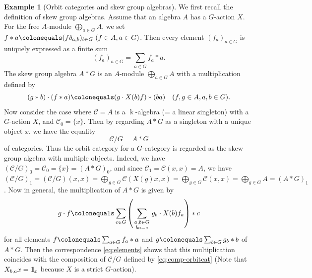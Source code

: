 \documentclass{surv-l}
\numberwithin{equation}{chapter}
\numberwithin{figure}{chapter}
\theoremstyle{plain}
\theoremstyle{definition}
\newtheorem{exm}[thm]{Example}
\theoremstyle{remark}
\newcommand{\id}{1\kern-.25em{\text{{\rm l}}}}
\begin{document}
\begin{exm}[Orbit categories and skew group algebras]\label{exm:skew-gp-alg}
We first recall the definition of skew group algebras.
Assume that an algebra $A$ has a $G$-action $X$.
For the free $A$-module
$\bigoplus_{a\in G}A$, we set $f * a\colonequals  (f \delta_{a,b})_{b \in G}\ (f \in A, a \in G)$.
Then every element $(f_a)_{a \in G}$ is uniquely expressed as a finite sum
\begin{equation}\label{eq:elements}
(f_a)_{a \in G} = \sum_{a \in G}f_a * a.
\end{equation}
The skew group algebra $A * G$ is an $A$-module $\bigoplus_{a\in G}A$
with a multiplication defined by
\[
(g * b) \cdot (f * a) \colonequals  (g \cdot X(b)f)*(ba) \quad (f, g \in A, a, b \in G).
\]
Now consider the case where ${\mathcal{C}} = A$ is a $\Bbbk$-algebra (= a linear singleton) with a $G$-action $X$,
and ${\mathcal{C}}_0 = \{x\}$.
Then by regarding $A * G$ as a singleton with a unique object $x$, we have the equality
\[
{\mathcal{C}}/G = A * G
\]
of categories.
Thus the orbit category for a $G$-category is regarded as
the skew group algebra with multiple objects.
Indeed, we have
$({\mathcal{C}}/G)_0 = {\mathcal{C}}_0 = \{x\} = (A * G)_0$, and
since ${\mathcal{C}}_1 = {\mathcal{C}}(x, x) = A$, we have
$({\mathcal{C}}/G)_1 = ({\mathcal{C}}/G)(x, x) = \bigoplus_{g\in G}{\mathcal{C}}(X(g)x, x) = \bigoplus_{g\in G}{\mathcal{C}}(x, x) = \bigoplus_{g\in G}A
= (A *G)_1$.
Now in general, the multiplication of $A * G$ is given by
\[
g\cdot f\colonequals  \sum_{c \in G}\left(\sum_{\begin{smallmatrix} a, b \in G\\ba = c \end{smallmatrix}} g_b \cdot X(b)f_a \right)* c
\]
for all elements $f\colonequals  \sum_{a \in G}f_a * a$ and $g\colonequals \sum_{b \in G}g_b * b$ of $A*G$.
Then the correspondence \eqref{eq:elements} shows that
this multiplication coincides with
the composition of ${\mathcal{C}}/G$ defined by \eqref{eq:comp-orbitcat}
(Note that $X_{b,a}x = \id_x$ because $X$ is a strict $G$-action).
\end{exm}
\end{document}
